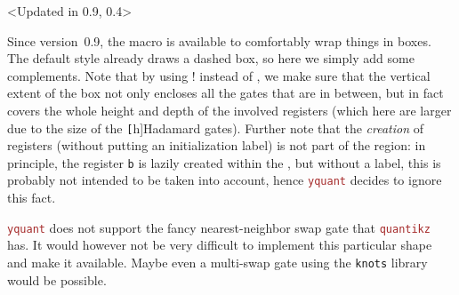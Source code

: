 \documentclass{scrartcl}
\makeatletter
\newenvironment{codeexample*}{%
   \VerbatimEnvironment%
   \let\FVB@VerbatimOut\minted@FVB@VerbatimOut
   \let\FVE@VerbatimOut\minted@FVE@VerbatimOut
   \minted@configlang{tex}%
   \minted@fvset
   \begin{VerbatimOut}[codes={\catcode`\^^I=12},firstline,lastline]{\minted@jobname.pyg}%
}{
   \end{VerbatimOut}%
   \minted@langlinenoson%
   \begin{adjustbox}{center}
       \minted@jobname.pyg %
   \end{adjustbox}\nopagebreak
   \expandafter\minted@pygmentize\expandafter{\minted@lang}%
   \minted@langlinenosoff%
   \par%
}
\def\pkg#1{\textcolor{brown}{\texttt{#1}}}
\def\ttlink{\link\texttt}
\def\texlink{\link\tex}
\def\Yquant{\pkg{yquant}}
\makeatother
\begin{document}
               \begin{example}<Updated in 0.9, 0.4>
                  \begin{codeexample*}
                  \end{codeexample*}
                  Since version~0.9, the \texlink{\encloseall} macro is available to comfortably wrap things in boxes.
                  The default style already draws a dashed box, so here we simply add some complements.
                  Note that by using \texlink{\encloseall}! instead of \texlink{\enclose}, we make sure that the vertical extent of the box not only encloses all the gates that are in between, but in fact covers the whole height and depth of the involved registers (which here are larger due to the size of the \ttlink[h]{Hadamard} gates).
                  Further note that the \emph{creation} of registers (without putting an initialization label) is not part of the region: in principle, the register \texttt{b} is lazily created within the \texlink{\encloseall}, but without a label, this is probably not intended to be taken into account, hence \Yquant{} decides to ignore this fact.
               \end{example}

               \Yquant{} does not support the fancy nearest\hyp neighbor swap gate that \pkg{quantikz} has.
               It would however not be very difficult to implement this particular shape and make it available.
               Maybe even a multi\hyp swap gate using the \texttt{knots} library would be possible.

         \clearpage
\end{document}
